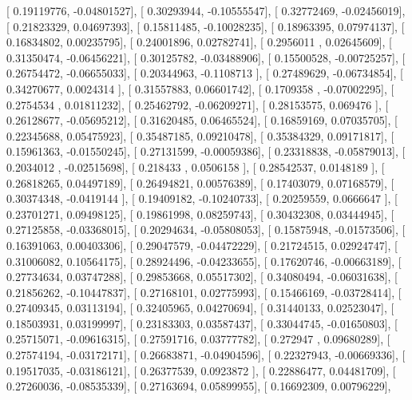 \documentclass{article}
\begin{document}
       [ 0.19119776, -0.04801527],
       [ 0.30293944, -0.10555547],
       [ 0.32772469, -0.02456019],
       [ 0.21823329,  0.04697393],
       [ 0.15811485, -0.10028235],
       [ 0.18963395,  0.07974137],
       [ 0.16834802,  0.00235795],
       [ 0.24001896,  0.02782741],
       [ 0.2956011 ,  0.02645609],
       [ 0.31350474, -0.06456221],
       [ 0.30125782, -0.03488906],
       [ 0.15500528, -0.00725257],
       [ 0.26754472, -0.06655033],
       [ 0.20344963, -0.1108713 ],
       [ 0.27489629, -0.06734854],
       [ 0.34270677,  0.0024314 ],
       [ 0.31557883,  0.06601742],
       [ 0.1709358 , -0.07002295],
       [ 0.2754534 ,  0.01811232],
       [ 0.25462792, -0.06209271],
       [ 0.28153575,  0.069476  ],
       [ 0.26128677, -0.05695212],
       [ 0.31620485,  0.06465524],
       [ 0.16859169,  0.07035705],
       [ 0.22345688,  0.05475923],
       [ 0.35487185,  0.09210478],
       [ 0.35384329,  0.09171817],
       [ 0.15961363, -0.01550245],
       [ 0.27131599, -0.00059386],
       [ 0.23318838, -0.05879013],
       [ 0.2034012 , -0.02515698],
       [ 0.218433  ,  0.0506158 ],
       [ 0.28542537,  0.0148189 ],
       [ 0.26818265,  0.04497189],
       [ 0.26494821,  0.00576389],
       [ 0.17403079,  0.07168579],
       [ 0.30374348, -0.0419144 ],
       [ 0.19409182, -0.10240733],
       [ 0.20259559,  0.0666647 ],
       [ 0.23701271,  0.09498125],
       [ 0.19861998,  0.08259743],
       [ 0.30432308,  0.03444945],
       [ 0.27125858, -0.03368015],
       [ 0.20294634, -0.05808053],
       [ 0.15875948, -0.01573506],
       [ 0.16391063,  0.00403306],
       [ 0.29047579, -0.04472229],
       [ 0.21724515,  0.02924747],
       [ 0.31006082,  0.10564175],
       [ 0.28924496, -0.04233655],
       [ 0.17620746, -0.00663189],
       [ 0.27734634,  0.03747288],
       [ 0.29853668,  0.05517302],
       [ 0.34080494, -0.06031638],
       [ 0.21856262, -0.10447837],
       [ 0.27168101,  0.02775993],
       [ 0.15466169, -0.03728414],
       [ 0.27409345,  0.03113194],
       [ 0.32405965,  0.04270694],
       [ 0.31440133,  0.02523047],
       [ 0.18503931,  0.03199997],
       [ 0.23183303,  0.03587437],
       [ 0.33044745, -0.01650803],
       [ 0.25715071, -0.09616315],
       [ 0.27591716,  0.03777782],
       [ 0.272947  ,  0.09680289],
       [ 0.27574194, -0.03172171],
       [ 0.26683871, -0.04904596],
       [ 0.22327943, -0.00669336],
       [ 0.19517035, -0.03186121],
       [ 0.26377539,  0.0923872 ],
       [ 0.22886477,  0.04481709],
       [ 0.27260036, -0.08535339],
       [ 0.27163694,  0.05899955],
       [ 0.16692309,  0.00796229],
\end{document}
